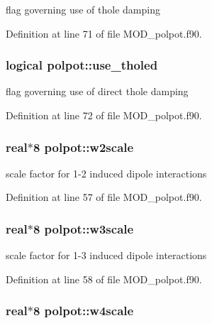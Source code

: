 flag governing use of thole damping 



Definition at line 71 of file M\-O\-D\-\_\-polpot.\-f90.

\hypertarget{classpolpot_ae13276c9ed18e0b57964b4d9dbb8280a}{
\subsubsection[{use\-\_\-tholed}]{\setlength{\rightskip}{0pt plus 5cm}logical polpot\-::use\-\_\-tholed}}\label{classpolpot_ae13276c9ed18e0b57964b4d9dbb8280a}


flag governing use of direct thole damping 



Definition at line 72 of file M\-O\-D\-\_\-polpot.\-f90.

\hypertarget{classpolpot_a35266232ef5bad9fdab31aede7f54a3a}{
\subsubsection[{w2scale}]{\setlength{\rightskip}{0pt plus 5cm}real$\ast$8 polpot\-::w2scale}}\label{classpolpot_a35266232ef5bad9fdab31aede7f54a3a}


scale factor for 1-\/2 induced dipole interactions 



Definition at line 57 of file M\-O\-D\-\_\-polpot.\-f90.

\hypertarget{classpolpot_ad0a29e94706d0210a94ac7897716f987}{
\subsubsection[{w3scale}]{\setlength{\rightskip}{0pt plus 5cm}real$\ast$8 polpot\-::w3scale}}\label{classpolpot_ad0a29e94706d0210a94ac7897716f987}


scale factor for 1-\/3 induced dipole interactions 



Definition at line 58 of file M\-O\-D\-\_\-polpot.\-f90.

\hypertarget{classpolpot_a80642be89424de1fa5eaf796a215c251}{
\subsubsection[{w4scale}]{\setlength{\rightskip}{0pt plus 5cm}real$\ast$8 polpot\-::w4scale}}\label{classpolpot_a80642be89424de1fa5eaf796a215c251}


